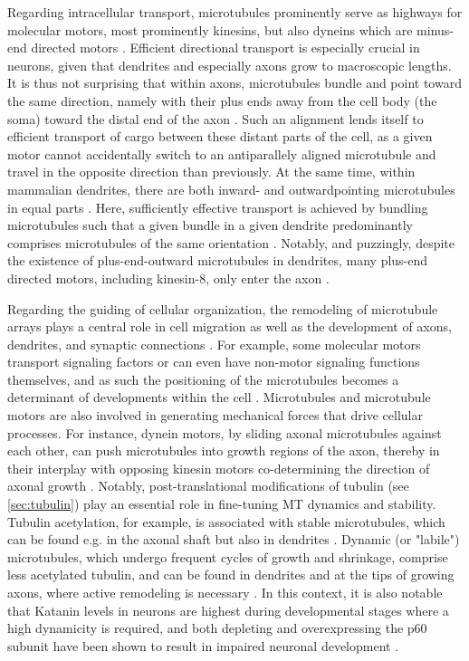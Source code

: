 Regarding intracellular transport, microtubules prominently serve as highways for molecular motors, most prominently kinesins, but also dyneins which are minus-end directed motors \parencite{Kapitein2015}. Efficient directional transport is especially crucial in neurons, given that dendrites and especially axons grow to macroscopic lengths. It is thus not surprising that within axons, microtubules bundle and point toward the same direction, namely with their plus ends away from the cell body (the soma) toward the distal end of the axon \parencite{Tas2017}. Such an alignment lends itself to efficient transport of cargo between these distant parts of the cell, as a given motor cannot accidentally switch to an antiparallely aligned microtubule and travel in the opposite direction than previously. At the same time, within mammalian dendrites, there are both inward- and outwardpointing microtubules in equal parts \parencite{Tas2017}. Here, sufficiently effective transport is achieved by bundling microtubules such that a given bundle in a given dendrite predominantly comprises microtubules of the same orientation \parencite{Tas2017}. Notably, and puzzingly, despite the existence of plus-end-outward microtubules in dendrites, many plus-end directed motors, including kinesin-8, only enter the axon \parencite{Lipka2016}.\par

Regarding the guiding of cellular organization, the remodeling of microtubule arrays plays a central role in cell migration as well as the development of axons, dendrites, and synaptic connections \parencite{Kapitein2015}. For example, some molecular motors transport signaling factors or can even have non-motor signaling functions themselves, and as such the positioning of the microtubules becomes a determinant of developments within the cell \parencite{Hirokawa2010}. Microtubules and microtubule motors are also involved in generating mechanical forces that drive cellular processes. For instance, dynein motors, by sliding axonal microtubules against each other, can push microtubules into growth regions of the axon, thereby in their interplay with opposing kinesin motors co-determining the direction of axonal growth \parencite{Kahn2016}. Notably, post-translational modifications of tubulin (see \autoref{sec:tubulin}) play an essential role in fine-tuning MT dynamics and stability. Tubulin acetylation, for example, is associated with stable microtubules, which can be found e.g. in the axonal shaft but also in dendrites \parencite{Tas2017}. Dynamic (or "labile") microtubules, which undergo frequent cycles of growth and shrinkage, comprise less acetylated tubulin, and can be found in dendrites and at the tips of growing axons, where active remodeling is necessary \parencite{Baas2016, Tas2017}. In this context, it is also notable that Katanin levels in neurons are highest during developmental stages where a high dynamicity is required, and both depleting and overexpressing the p60 subunit have been shown to result in impaired neuronal development \parencite{Karabay2004}.\par

